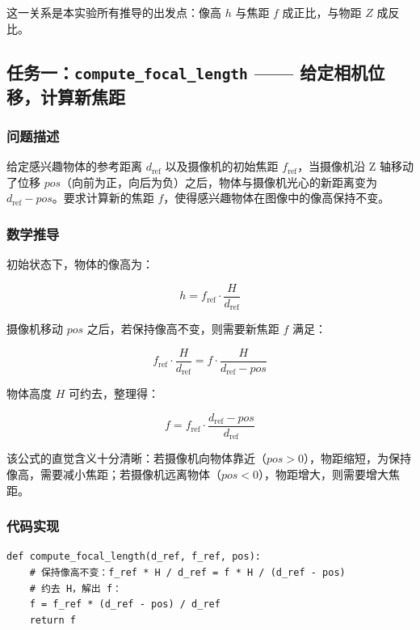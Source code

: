 \documentclass[12pt,a4paper]{ctexart}
\begin{document}
这一关系是本实验所有推导的出发点：像高 $h$ 与焦距 $f$ 成正比，与物距 $Z$ 成反比。

\subsection{任务一：\texttt{compute\_focal\_length} —— 给定相机位移，计算新焦距}

\subsubsection{问题描述}

给定感兴趣物体的参考距离 $d_\text{ref}$ 以及摄像机的初始焦距 $f_\text{ref}$，当摄像机沿 Z 轴移动了位移 $pos$（向前为正，向后为负）之后，物体与摄像机光心的新距离变为 $d_\text{ref} - pos$。要求计算新的焦距 $f$，使得感兴趣物体在图像中的像高保持不变。

\subsubsection{数学推导}

初始状态下，物体的像高为：

\begin{equation}
  h = f_\text{ref} \cdot \frac{H}{d_\text{ref}}
\end{equation}

摄像机移动 $pos$ 之后，若保持像高不变，则需要新焦距 $f$ 满足：

\begin{equation}
  f_\text{ref} \cdot \frac{H}{d_\text{ref}} = f \cdot \frac{H}{d_\text{ref} - pos}
\end{equation}

物体高度 $H$ 可约去，整理得：

\begin{equation}
  \boxed{f = f_\text{ref} \cdot \frac{d_\text{ref} - pos}{d_\text{ref}}}
  \label{eq:focal}
\end{equation}

该公式的直觉含义十分清晰：若摄像机向物体靠近（$pos > 0$），物距缩短，为保持像高，需要减小焦距；若摄像机远离物体（$pos < 0$），物距增大，则需要增大焦距。

\subsubsection{代码实现}

\begin{lstlisting}
def compute_focal_length(d_ref, f_ref, pos):
    # 保持像高不变：f_ref * H / d_ref = f * H / (d_ref - pos)
    # 约去 H，解出 f：
    f = f_ref * (d_ref - pos) / d_ref
    return f
\end{lstlisting}
\end{document}
